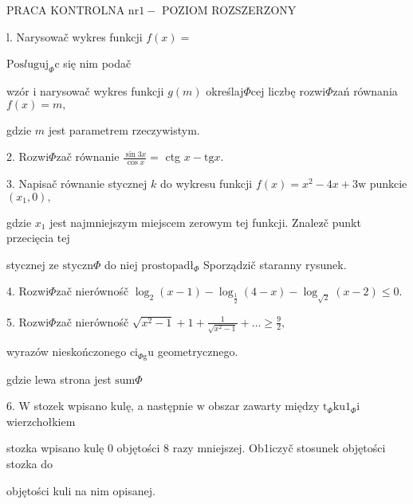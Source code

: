 \documentclass[a4paper,12pt]{article}
\begin{document}
PRACA KONTROLNA $\mathrm{n}\mathrm{r} 1 -$ POZIOM ROZSZERZONY

l. Narysowač wykres funkcji $f(x)=$ 

$\mathrm{P}\mathrm{o}\mathrm{s}l\mathrm{u}\mathrm{g}\mathrm{u}\mathrm{j}_{\Phi}\mathrm{c}$ się nim podač

wzór $\mathrm{i}$ narysowač wykres funkcji $g(m)$ określaj$\Phi$cej liczbę rozwi$\Phi$zań równania $f(x)=m,$

gdzie $m$ jest parametrem rzeczywistym.

2. Rozwi$\Phi$zač równanie $\displaystyle \frac{\sin 3x}{\cos x}=$ ctg $x-\mathrm{t}\mathrm{g}x.$

3. Napisač równanie stycznej $k$ do wykresu funkcji $f(x)=x^{2}-4x+3\mathrm{w}$ punkcie $(x_{1},0),$

gdzie $x_{1}$ jest najmniejszym miejscem zerowym tej funkcji. Znalez$\acute{}$č punkt przecięcia tej

stycznej ze $\mathrm{s}\mathrm{t}\mathrm{y}\mathrm{c}\mathrm{z}\mathrm{n}\Phi$ do niej $\mathrm{p}\mathrm{r}\mathrm{o}\mathrm{s}\mathrm{t}\mathrm{o}\mathrm{p}\mathrm{a}\mathrm{d}\text{ł}_{\Phi}$ Sporządzič staranny rysunek.

4. Rozwi$\Phi$zač nierównośč $\log_{2}(x-1)-\log_{\frac{1}{2}}(4-x)-\log_{\sqrt{2}}(x-2)\leq 0.$

5. Rozwi$\Phi$zač nierównośč $\displaystyle \sqrt{x^{2}-1}+1+\frac{1}{\sqrt{x^{2}-1}}+\ldots\geq \displaystyle \frac{9}{2},$

wyrazów nieskończonego $\mathrm{c}\mathrm{i}_{\Phi \mathrm{g}}\mathrm{u}$ geometrycznego.

gdzie lewa strona jest $\mathrm{s}\mathrm{u}\mathrm{m}\Phi$

6. $\mathrm{W}$ stozek wpisano kulę, a następnie $\mathrm{w}$ obszar zawarty między $\mathrm{t}_{\Phi}\mathrm{k}\mathrm{u}1_{\Phi}\mathrm{i}$ wierzchołkiem

stozka wpisano kulę $0$ objętości 8 razy mniejszej. Ob1iczyč stosunek objętości stozka do

objętości kuli na nim opisanej.
\end{document}
